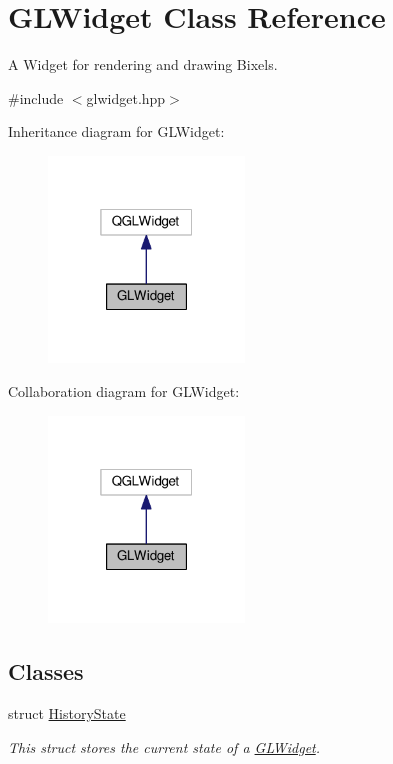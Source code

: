 \hypertarget{classGLWidget}{\section{G\-L\-Widget Class Reference}
\label{classGLWidget}
}


A Widget for rendering and drawing Bixels.  




{\ttfamily \#include $<$glwidget.\-hpp$>$}



Inheritance diagram for G\-L\-Widget\-:\nopagebreak
\begin{figure}[H]
\begin{center}
\leavevmode
\includegraphics[width=148pt]{classGLWidget__inherit__graph}
\end{center}
\end{figure}


Collaboration diagram for G\-L\-Widget\-:\nopagebreak
\begin{figure}[H]
\begin{center}
\leavevmode
\includegraphics[width=148pt]{classGLWidget__coll__graph}
\end{center}
\end{figure}
\subsection*{Classes}
\begin{DoxyCompactItemize}
\item 
struct \hyperlink{structGLWidget_1_1HistoryState}{History\-State}
\begin{DoxyCompactList}\small\item\em This struct stores the current state of a \hyperlink{classGLWidget}{G\-L\-Widget}. \end{DoxyCompactList}\end{DoxyCompactItemize}

